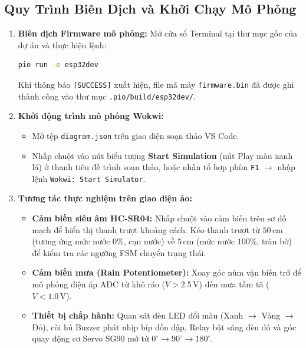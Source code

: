 \subsection{Quy Trình Biên Dịch và Khởi Chạy Mô Phỏng}
\begin{enumerate}
    \item \textbf{Biên dịch Firmware mô phỏng:}
    Mở cửa sổ Terminal tại thư mục gốc của dự án và thực hiện lệnh:
    \begin{lstlisting}[language=bash]
pio run -e esp32dev
    \end{lstlisting}
    Khi thông báo \texttt{[SUCCESS]} xuất hiện, file mã máy \texttt{firmware.bin} đã được ghi thành công vào thư mục \texttt{.pio/build/esp32dev/}.
    
    \item \textbf{Khởi động trình mô phỏng Wokwi:}
    \begin{itemize}
        \item Mở tệp \texttt{diagram.json} trên giao diện soạn thảo VS Code.
        \item Nhấp chuột vào nút biểu tượng \textbf{Start Simulation} (nút Play màu xanh lá) ở thanh tiêu đề trình soạn thảo, hoặc nhấn tổ hợp phím \texttt{F1} $\rightarrow$ nhập lệnh \texttt{Wokwi: Start Simulator}.
    \end{itemize}
    
    \item \textbf{Tương tác thực nghiệm trên giao diện ảo:}
    \begin{itemize}
        \item \textbf{Cảm biến siêu âm HC-SR04:} Nhấp chuột vào cảm biến trên sơ đồ mạch để hiển thị thanh trượt khoảng cách. Kéo thanh trượt từ $50\,\text{cm}$ (tương ứng mức nước $0\%$, cạn nước) về $5\,\text{cm}$ (mức nước $100\%$, tràn bờ) để kiểm tra các ngưỡng FSM chuyển trạng thái.
        \item \textbf{Cảm biến mưa (Rain Potentiometer):} Xoay góc núm vặn biến trở để mô phỏng điện áp ADC từ khô ráo ($V > 2.5\,\text{V}$) đến mưa tầm tã ($V < 1.0\,\text{V}$).
        \item \textbf{Thiết bị chấp hành:} Quan sát đèn LED đổi màu (Xanh $\rightarrow$ Vàng $\rightarrow$ Đỏ), còi hú Buzzer phát nhịp bíp dồn dập, Relay bật sáng đèn đỏ và góc quay động cơ Servo SG90 mở từ $0^\circ \to 90^\circ \to 180^\circ$.
    \end{itemize}
\end{enumerate}

